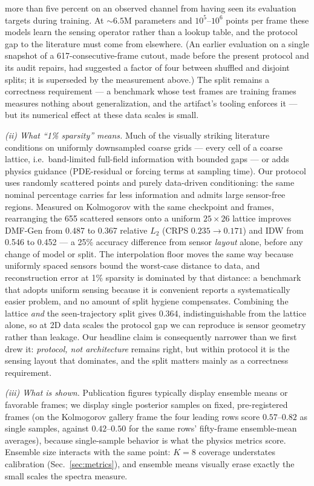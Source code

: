 \documentclass[aip,pof,reprint,amsmath,amssymb,superscriptaddress]{revtex4-1}
\newcommand{\dmfgen}{DMF-Gen}
\begin{document}
more than five percent on an observed channel from having seen its evaluation
targets during training. At ${\sim}6.5$M parameters and $10^5$--$10^6$ points per frame
these models learn the sensing operator rather than a lookup table, and the
protocol gap to the literature must come from elsewhere. (An earlier
evaluation on a single snapshot of a 617-consecutive-frame cutout, made
before the present protocol and its audit repairs, had suggested a factor of
four between shuffled and disjoint splits; it is superseded by the
measurement above.) The split remains a correctness requirement --- a
benchmark whose test frames are training frames measures nothing about
generalization, and the artifact's tooling enforces it --- but its numerical
effect at these data scales is small.

\emph{(ii) What ``1\% sparsity'' means.} Much of the visually striking
literature conditions on uniformly downsampled coarse grids --- every cell
of a coarse lattice, i.e.\ band-limited full-field information with bounded
gaps --- or adds physics guidance (PDE-residual or forcing terms at sampling
time\cite{shu2023physics,huang2024diffusionpde}). Our protocol uses randomly
scattered points and purely data-driven conditioning: the same nominal
percentage carries far less information and admits large sensor-free
regions. Measured on Kolmogorov with the same checkpoint and frames,
rearranging the 655 scattered sensors onto a uniform $25{\times}26$ lattice
improves \dmfgen{} from 0.487 to 0.367 relative $L_2$ (CRPS $0.235{\to}
0.171$) and IDW from 0.546 to 0.452 --- a 25\% accuracy difference from
sensor \emph{layout} alone, before any change of model or split. The
interpolation floor moves the same way because uniformly spaced sensors bound
the worst-case distance to data, and reconstruction error at 1\% sparsity is
dominated by that distance: a benchmark that adopts uniform sensing because
it is convenient reports a systematically easier problem, and no amount of
split hygiene compensates. Combining the lattice \emph{and} the
seen-trajectory split gives 0.364, indistinguishable from the lattice alone,
so at 2D data scales the protocol gap we can reproduce is sensor geometry
rather than leakage. Our headline claim is consequently narrower than we
first drew it: \emph{protocol, not architecture} remains right, but within
protocol it is the sensing layout that dominates, and the split matters mainly
as a correctness requirement.

\emph{(iii) What is shown.} Publication figures typically display ensemble
means or favorable frames; we display single posterior samples on fixed,
pre-registered frames (on the Kolmogorov gallery frame the four leading
rows score $0.57$--$0.82$ as single samples, against $0.42$--$0.50$ for the
same rows' fifty-frame ensemble-mean averages), because single-sample
behavior is what the physics metrics score. Ensemble size interacts with the
same point: $K{=}8$ coverage understates calibration
(Sec.~\ref{sec:metrics}), and ensemble means visually erase exactly the
small scales the spectra measure.
\end{document}

